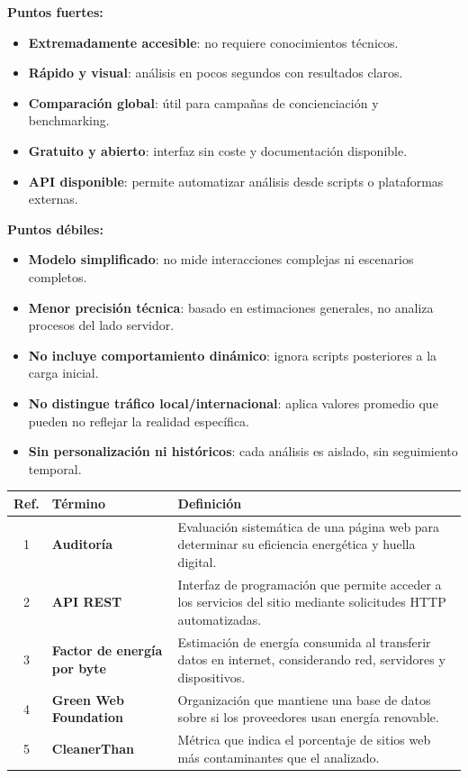 \documentclass[12pt,a4paper]{report}
\begin{document}
\textbf{Puntos fuertes:}
\begin{itemize}
    \item \textbf{Extremadamente accesible}: no requiere conocimientos técnicos.
    \item \textbf{Rápido y visual}: análisis en pocos segundos con resultados claros.
    \item \textbf{Comparación global}: útil para campañas de concienciación y benchmarking.
    \item \textbf{Gratuito y abierto}: interfaz sin coste y documentación disponible.
    \item \textbf{API disponible}: permite automatizar análisis desde scripts o plataformas externas.
\end{itemize}

\textbf{Puntos débiles:}
\begin{itemize}
    \item \textbf{Modelo simplificado}: no mide interacciones complejas ni escenarios completos.
    \item \textbf{Menor precisión técnica}: basado en estimaciones generales, no analiza procesos del lado servidor.
    \item \textbf{No incluye comportamiento dinámico}: ignora scripts posteriores a la carga inicial.
    \item \textbf{No distingue tráfico local/internacional}: aplica valores promedio que pueden no reflejar la realidad específica.
    \item \textbf{Sin personalización ni históricos}: cada análisis es aislado, sin seguimiento temporal.
\end{itemize}

\begin{table}[h]
\centering
\begin{tabular}{@{}cll@{}}
\toprule
\textbf{Ref.} & \textbf{Término} & \textbf{Definición} \\
\midrule
1 & \textbf{Auditoría} & Evaluación sistemática de una página web para determinar su eficiencia energética y huella digital. \\
2 & \textbf{API REST} & Interfaz de programación que permite acceder a los servicios del sitio mediante solicitudes HTTP automatizadas. \\
3 & \textbf{Factor de energía por byte} & Estimación de energía consumida al transferir datos en internet, considerando red, servidores y dispositivos. \\
4 & \textbf{Green Web Foundation} & Organización que mantiene una base de datos sobre si los proveedores usan energía renovable. \\
5 & \textbf{CleanerThan} & Métrica que indica el porcentaje de sitios web más contaminantes que el analizado. \\
\bottomrule
\end{tabular}
\end{table}
\end{document}
